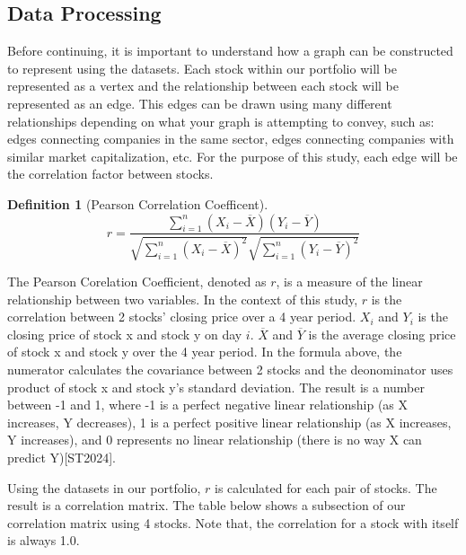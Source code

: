 \documentclass{article}
\newtheorem{definition}[theorem]{Definition}
\begin{document}
\subsection{Data Processing}

Before continuing, it is important to understand how a graph can be constructed to represent using the datasets. Each stock within our portfolio will be represented as a vertex and the relationship between each stock will be represented as an edge. This edges can be drawn using many different relationships depending on what your graph is attempting to convey, such as: edges connecting companies in the same sector, edges connecting companies with similar market capitalization, etc. For the purpose of this study, each edge will be the correlation factor between stocks.

\begin{definition}[Pearson Correlation Coefficent]
\[
r = \frac{\sum_{i=1}^n (X_i - \overline{X})(Y_i - \overline{Y})}{\sqrt{\sum_{i=1}^n (X_i - \overline{X})^2} \sqrt{\sum_{i=1}^n (Y_i - \overline{Y})^2}}
\]
\end{definition}


The Pearson Corelation Coefficient, denoted as $r$, is a measure of the linear relationship between two variables. In the context of this study, $r$ is the correlation between 2 stocks' closing price over a 4 year period. $X_i$ and $Y_i$ is the closing price of stock x and stock y on day $i$. $\overline{X}$ and $\overline{Y}$ is the average closing price of stock x and stock y over the 4 year period. In the formula above, the numerator calculates the covariance between 2 stocks and the deonominator uses product of stock x and stock y's standard deviation. The result is a number between -1 and 1, where -1 is a perfect negative linear relationship (as X increases, Y decreases), 1 is a perfect positive linear relationship (as X increases, Y increases), and 0 represents no linear relationship (there is no way X can predict Y)[ST2024]. 

Using the datasets in our portfolio, $r$ is calculated for each pair of stocks. The result is a correlation matrix. The table below shows a subsection of our correlation matrix using 4 stocks. Note that, the correlation for a stock with itself is always 1.0.
\end{document}
